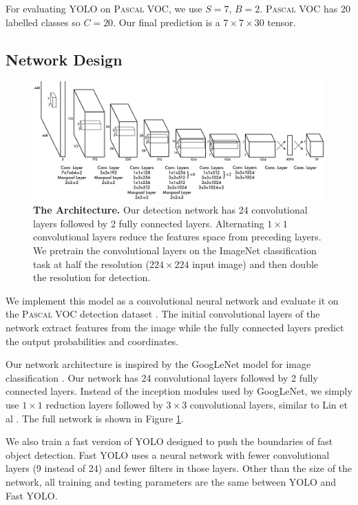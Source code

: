\documentclass[10pt,twocolumn,letterpaper]{article}
\begin{document}
For evaluating YOLO on \textsc{Pascal} VOC, we use $S=7$, $B=2$. \textsc{Pascal} VOC has 20 labelled classes so $C=20$. Our final prediction is a $7 \times 7 \times 30$ tensor.


\subsection{Network Design}

   \begin{figure}[t]
      \centering
        \includegraphics[width=.8\linewidth]{net}
      \caption{\small \textbf{The Architecture.} Our detection network has 24 convolutional layers followed by 2 fully connected layers. Alternating $1 \times 1$ convolutional layers reduce the features space from preceding layers. We pretrain the convolutional layers on the ImageNet classification task at half the resolution ($224 \times 224$ input image) and then double the resolution for detection.}
      \label{net}
   \end{figure}

We implement this model as a convolutional neural network and evaluate it on the \textsc{Pascal} VOC detection dataset \cite{Everingham15}. The initial convolutional layers of the network extract features from the image while the fully connected layers predict the output probabilities and coordinates.

Our network architecture is inspired by the GoogLeNet model for image classification \cite{DBLP:journals/corr/SzegedyLJSRAEVR14}. Our network has 24 convolutional layers followed by 2 fully connected layers. Instead of the inception modules used by GoogLeNet, we simply use $1 \times 1$ reduction layers followed by $3 \times 3$ convolutional layers, similar to Lin et al \cite{DBLP:journals/corr/LinCY13}. The full network is shown in Figure \ref{net}.

We also train a fast version of YOLO designed to push the boundaries of fast object detection. Fast YOLO uses a neural network with fewer convolutional layers (9 instead of 24) and fewer filters in those layers. Other than the size of the network, all training and testing parameters are the same between YOLO and Fast YOLO.
\end{document}
